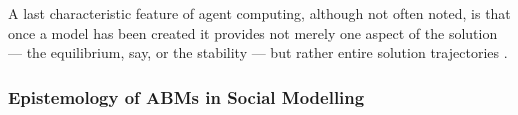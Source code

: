 \documentclass[11pt,oneside,a4paper,openright]{report}
\begin{document}
A last characteristic feature of agent computing, although not often noted, is that once a model has been created it provides not merely one aspect of the solution — the equilibrium, say, or the stability — but rather entire solution trajectories \cite{Axtell2000}.\\




\subsubsection{Epistemology of ABMs in Social Modelling}
\end{document}
